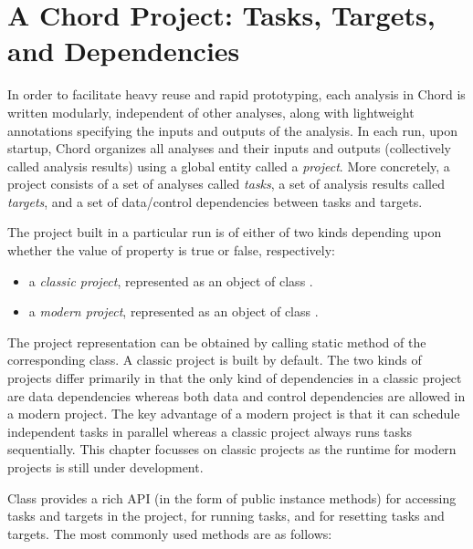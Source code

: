 \chapter{A Chord Project: Tasks, Targets, and Dependencies}
\label{chap:project}

In order to facilitate heavy reuse and rapid prototyping, each analysis in Chord is
written modularly, independent of other analyses, along with lightweight annotations
specifying the inputs and outputs of the analysis.
In each run, upon startup, Chord organizes all analyses and their inputs and outputs
(collectively called analysis results) using a global entity
called a {\it project}.  More concretely, a project consists of a set of
analyses called {\it tasks}, a set of analysis results called {\it targets}, and
a set of data/control dependencies between tasks and targets.

The project built in a particular run is of either of two kinds depending upon whether
the value of property  is true or false, respectively:
\begin{itemize}
\item
a {\it classic project}, represented as an object of
class .
\item
a {\it modern project}, represented as an object of
class .
\end{itemize}
The project representation can be obtained by calling static method  of the
corresponding class.
A classic project is built by default.
The two kinds of projects differ
primarily in that the only kind of dependencies in a classic
project are data dependencies whereas both data and control dependencies are
allowed in a modern project.  The key advantage of a modern project is that it
can schedule independent tasks in parallel whereas a classic project always
runs tasks sequentially.  This chapter focusses on classic projects as the
runtime for modern projects is still under development.

Class 
provides a rich API (in the form of public instance methods) for accessing tasks
and targets in the project, for running tasks, and for resetting tasks and
targets.  The most commonly used methods are as follows:

